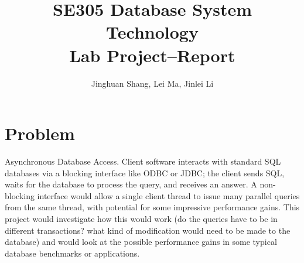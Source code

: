 \documentclass{article}
\title{SE305 Database System Technology\\Lab Project--Report\\}
\author{Jinghuan Shang, Lei Ma, Jinlei Li}
\begin{document}
	\maketitle
	
	\section*{Problem}
		Asynchronous Database Access. Client software interacts with standard SQL databases via a blocking interface like ODBC or JDBC; the client sends SQL, waits for the database to process the query, and receives an answer. A non-blocking interface would allow a single client thread to issue many parallel queries from the same thread, with potential for some impressive performance gains. This project would investigate how this would work (do the queries have to be in different transactions? what kind of modification would need to be made to the database) and would look at the possible performance gains in some typical database benchmarks or applications.
\end{document}

